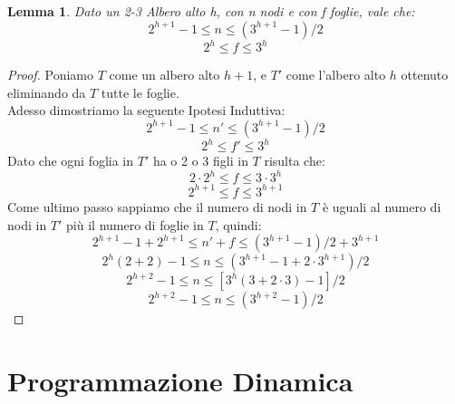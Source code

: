 \documentclass{article}
\newtheorem{lemma}{Lemma}[section]
\begin{document}
\begin{lemma}
    Dato un 2-3 Albero alto h, con n nodi e con f foglie, vale che:
    \begin{equation*}
        2^{h+1}-1 \leq n \leq (3^{h+1} - 1) / 2
    \end{equation*}
    \begin{equation*}
        2^h \leq f \leq 3^h
    \end{equation*}
\end{lemma}

\begin{proof}
    Poniamo $T$ come un albero alto $h + 1$, e $T'$ come l'albero alto $h$ ottenuto eliminando da $T$ tutte le foglie. \\
    Adesso dimostriamo la seguente Ipotesi Induttiva:
    \begin{equation*}
        2^{h+1}-1 \leq n' \leq (3^{h+1} - 1) / 2
    \end{equation*}
    \begin{equation*}
        2^h \leq f' \leq 3^h
    \end{equation*}
    Dato che ogni foglia in $T'$ ha o 2 o 3 figli in $T$ risulta che:
    \begin{equation*}
        2 \cdot 2^h \leq f \leq 3 \cdot 3^h
    \end{equation*}
    \begin{equation*}
        2^{h+1} \leq f \leq 3^{h+1}
    \end{equation*}
    Come ultimo passo sappiamo che il numero di nodi in $T$ è uguali al numero di nodi in $T'$ più il numero di foglie in $T$, quindi:
    \begin{equation*}
        2^{h+1}-1 + 2^{h+1} \leq n' + f \leq (3^{h+1}-1) / 2 + 3^{h+1}
    \end{equation*}
    \begin{equation*}
        2^h(2 + 2) - 1 \leq n \leq (3^{h+1}-1 + 2 \cdot 3^{h+1}) / 2
    \end{equation*}
    \begin{equation*}
        2^{h+2} - 1 \leq n \leq [3^h(3 + 2 \cdot 3) - 1] / 2
    \end{equation*}
    \begin{equation*}
        2^{h+2} - 1 \leq n \leq (3^{h+2} - 1) / 2
    \end{equation*}
\end{proof}

\section{Programmazione Dinamica}
\end{document}
